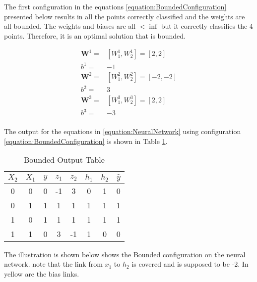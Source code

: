 \documentclass[a4paper,12pt]{article}
\begin{document}
The first configuration in the equations \ref{equation:BoundedConfiguration} presented below results in all the points correctly classified and the weights are all bounded. The weights and biases are all $ < \inf$ 
but it correctly classifies the 4 points. Therefore, it is an optimal solution that is bounded. 

\begin{equation}
\label{equation:BoundedConfiguration}
\begin{split}
\mathbf{W}^{1} =& [W^{1}_{1},W^{1}_{2}] = [2, 2] \\
b^{1} =& -1 \\
\mathbf{W}^{2} =& [W^{2}_{1}, W^{2}_{2}] = [-2, -2] \\
b^{2} =& 3 \\
\mathbf{W}^{3} =& [W^{3}_{1}, W^{3}_{2}] = [2, 2] \\
b^{3} =& -3 \\
\end{split}
\end{equation}

The output for the equations in \ref{equation:NeuralNetwork} using configuration \ref{equation:BoundedConfiguration} is shown in Table \ref{table:BoundedOutput}.

\begin{table}[ht]
\centering %
\caption{Bounded Output Table} %
\label{table:BoundedOutput} %
\begin{tabular}{c c c c c c c c} %
\hline %
$X_{2}$ & $X_{1}$ & $y$ & $z_{1}$  & $z_{2}$  & $h_{1}$ & $h_{2}$ & $\hat{y}$ \\ [0.5ex] 
\hline
0 & 0 & 0 & -1 &  3  & 0 & 1 & 0 \\
0 & 1 & 1 &  1 &  1  & 1 & 1 & 1 \\
1 & 0 & 1 &  1 &  1  & 1 & 1 & 1 \\
1 & 1 & 0 &  3 & -1  & 1 & 0 & 0 \\ [1ex] %
\hline %
\end{tabular}
\end{table}

The illustration is shown below shows the Bounded configuration on the neural network. note that the link from $x_{1}$ to $h_{2}$ is covered and is supposed to be -2. 
In yellow are the bias links. 
\end{document}
